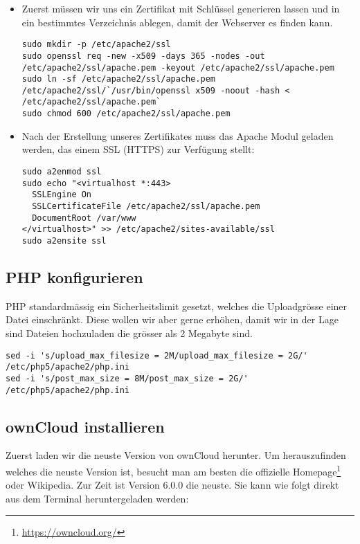 \begin{itemize}
  \item Zuerst müssen wir uns ein Zertifikat mit Schlüssel generieren lassen und in ein bestimmtes Verzeichnis ablegen, damit der Webserver es finden kann.
    \begin{lstlisting}
sudo mkdir -p /etc/apache2/ssl
sudo openssl req -new -x509 -days 365 -nodes -out /etc/apache2/ssl/apache.pem -keyout /etc/apache2/ssl/apache.pem
sudo ln -sf /etc/apache2/ssl/apache.pem /etc/apache2/ssl/`/usr/bin/openssl x509 -noout -hash < /etc/apache2/ssl/apache.pem`
sudo chmod 600 /etc/apache2/ssl/apache.pem
    \end{lstlisting}
  \item Nach der Erstellung unseres Zertifikates muss das Apache Modul geladen werden, das einem SSL (HTTPS) zur Verfügung stellt:
    \begin{lstlisting}
sudo a2enmod ssl
sudo echo "<virtualhost *:443>
  SSLEngine On
  SSLCertificateFile /etc/apache2/ssl/apache.pem
  DocumentRoot /var/www
</virtualhost>" >> /etc/apache2/sites-available/ssl
sudo a2ensite ssl
    \end{lstlisting}
\end{itemize}

\subsection{PHP konfigurieren}
PHP standardmässig ein Sicherheitslimit gesetzt, welches die Uploadgrösse einer Datei einschränkt. Diese wollen wir aber gerne erhöhen, damit wir in der Lage sind Dateien hochzuladen die grösser als 2 Megabyte sind.

\begin{lstlisting}
sed -i 's/upload_max_filesize = 2M/upload_max_filesize = 2G/' /etc/php5/apache2/php.ini
sed -i 's/post_max_size = 8M/post_max_size = 2G/' /etc/php5/apache2/php.ini
\end{lstlisting}

\subsection{ownCloud installieren}
Zuerst laden wir die neuste Version von ownCloud herunter. Um herauszufinden welches die neuste Version ist, besucht man am besten die offizielle Homepage\footnote{\url{https://owncloud.org/}} oder Wikipedia. Zur Zeit ist Version 6.0.0 die neuste. Sie kann wie folgt direkt aus dem Terminal heruntergeladen werden:

